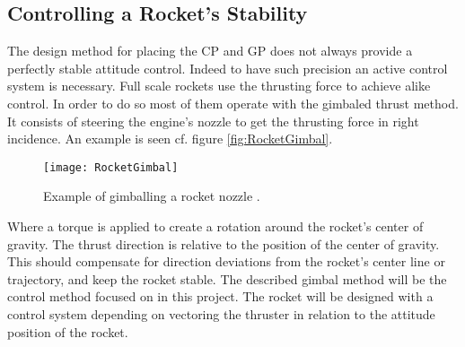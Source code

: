 \subsection{Controlling a Rocket's Stability}
The design method for placing the CP and GP does not always provide a perfectly stable attitude control. Indeed to have such precision an active control system is necessary. Full scale rockets use the thrusting force to achieve alike control. In order to do so most of them operate with the gimbaled thrust method. It consists of steering the engine's nozzle to get the thrusting force in right incidence. An example is seen cf. figure \autoref{fig:RocketGimbal}. 
\begin{figure} [htbp]
	\centering
	\texttt{[image: RocketGimbal]}
	\caption{Example of gimballing a rocket nozzle \cite{web:rocketnasa}.}
	\label{fig:RocketGimbal}
\end{figure}
\newpage

Where a torque is applied to create a rotation around the rocket's center of gravity. The thrust direction is relative to the position of the center of gravity.  This should compensate for direction deviations from the rocket's center line or trajectory, and keep the rocket stable. The described gimbal method will be the control method focused on in this project. The rocket will be designed with a control system depending on vectoring the thruster in relation to the attitude position of the rocket. 

